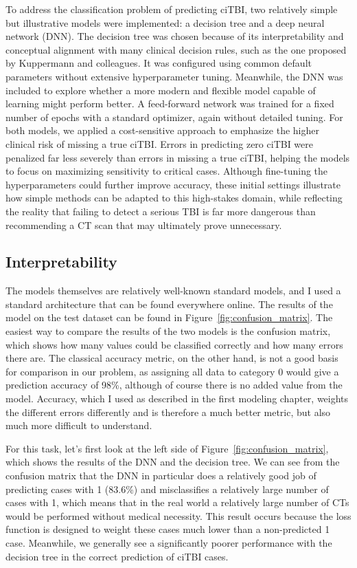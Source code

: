 \documentclass[10pt,letterpaper]{article}
\begin{document}
To address the classification problem of predicting ciTBI, two relatively simple but illustrative models were implemented: a decision tree and a deep neural network (DNN). The decision tree was chosen because of its interpretability and conceptual alignment with many clinical decision rules, such as the one proposed by Kuppermann and colleagues. It was configured using common default parameters without extensive hyperparameter tuning. Meanwhile, the DNN was included to explore whether a more modern and flexible model capable of learning might perform better. A feed-forward network was trained for a fixed number of epochs with a standard optimizer, again without detailed tuning. For both models, we applied a cost-sensitive approach to emphasize the higher clinical risk of missing a true ciTBI. Errors in predicting zero ciTBI were penalized far less severely than errors in missing a true ciTBI, helping the models to focus on maximizing sensitivity to critical cases. Although fine-tuning the hyperparameters could further improve accuracy, these initial settings illustrate how simple methods can be adapted to this high-stakes domain, while reflecting the reality that failing to detect a serious TBI is far more dangerous than recommending a CT scan that may ultimately prove unnecessary.

\subsection{Interpretability}

The models themselves are relatively well-known standard models, and I used a standard architecture that can be found everywhere online. The results of the model on the test dataset can be found in Figure~\ref{fig:confusion_matrix}. The easiest way to compare the results of the two models is the confusion matrix, which shows how many values could be classified correctly and how many errors there are. The classical accuracy metric, on the other hand, is not a good basis for comparison in our problem, as assigning all data to category 0 would give a prediction accuracy of 98\%, although of course there is no added value from the model. Accuracy, which I used as described in the first modeling chapter, weights the different errors differently and is therefore a much better metric, but also much more difficult to understand.

For this task, let's first look at the left side of Figure~\ref{fig:confusion_matrix}, which shows the results of the DNN and the decision tree. We can see from the confusion matrix that the DNN in particular does a relatively good job of predicting cases with 1 (83.6\%) and misclassifies a relatively large number of cases with 1, which means that in the real world a relatively large number of CTs would be performed without medical necessity. This result occurs because the loss function is designed to weight these cases much lower than a non-predicted 1 case. Meanwhile, we generally see a significantly poorer performance with the decision tree in the correct prediction of ciTBI cases.
\end{document}
